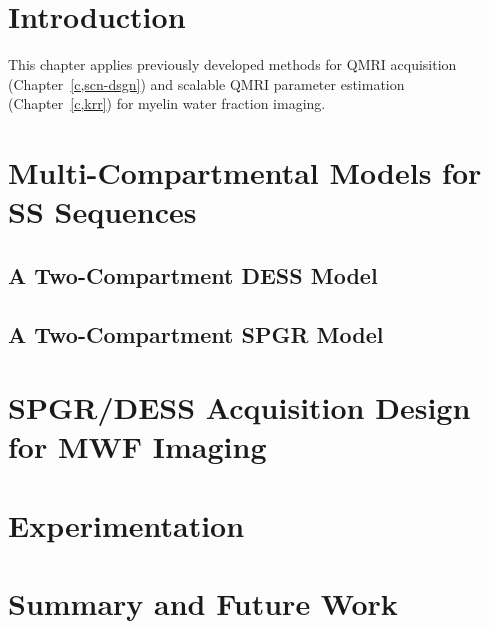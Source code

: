 
\section{Introduction}
\label{s,mwf,intro}



This chapter applies previously developed methods
for QMRI acquisition (Chapter~\ref{c,scn-dsgn})
and scalable QMRI parameter estimation (Chapter~\ref{c,krr})
for myelin water fraction imaging.

\section{Multi-Compartmental Models for SS Sequences}
\label{s,mwf,model}

\subsection{A Two-Compartment DESS Model}
\label{ss,mwf,model,dess}


\subsection{A Two-Compartment SPGR Model}
\label{ss,mwf,model,spgr}


\section{SPGR/DESS Acquisition Design for MWF Imaging}
\label{s,mwf,acq}


\section{Experimentation}
\label{s,mwf,exp}


\section{Summary and Future Work}
\label{s,mwf,summ}


